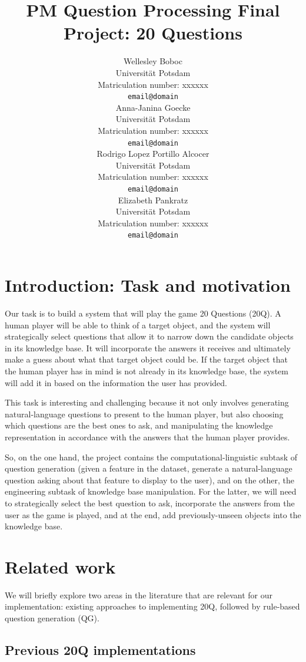 \documentclass[11pt,a4paper]{article}
\title{PM Question Processing Final Project: 20 Questions}
\author{Wellesley Boboc \\
Universit{\"a}t Potsdam \\
Matriculation number: xxxxxx \\
\texttt{email@domain} \\\And
Anna-Janina Goecke \\
Universit{\"a}t Potsdam \\
Matriculation number: xxxxxx \\
\texttt{email@domain} \\\AND
Rodrigo Lopez Portillo Alcocer \\
Universit{\"a}t Potsdam \\
Matriculation number: xxxxxx \\
\texttt{email@domain} \\\And
Elizabeth Pankratz \\
Universit{\"a}t Potsdam \\
Matriculation number: xxxxxx \\
\texttt{email@domain} \\}
\date{}
\begin{document}
\maketitle

\begin{abstract}
\lipsum[1]
\end{abstract}

\section{Introduction: Task and motivation}

Our task is to build a system that will play the game 20 Questions (20Q).
A human player will be able to think of a target object, and the system will strategically select questions that allow it to narrow down the candidate objects in its knowledge base.
It will incorporate the answers it receives and ultimately make a guess about what that target object could be.
If the target object that the human player has in mind is not already in its knowledge base, the system will add it in based on the information the user has provided.

This task is interesting and challenging because it not only involves generating natural-language questions to present to the human player, but also choosing which questions are the best ones to ask, and manipulating the knowledge representation in accordance with the answers that the human player provides.

So, on the one hand, the project contains the computational-linguistic subtask of question generation (given a feature in the dataset, generate a natural-language question asking about that feature to display to the user), and on the other, the engineering subtask of knowledge base manipulation.
For the latter, we will need to strategically select the best question to ask, incorporate the answers from the user as the game is played, and at the end, add previously-unseen objects into the knowledge base.

\section{Related work}

We will briefly explore two areas in the literature that are relevant for our implementation: existing approaches to implementing 20Q, followed by rule-based question generation (QG).

\subsection{Previous 20Q implementations}
\end{document}
